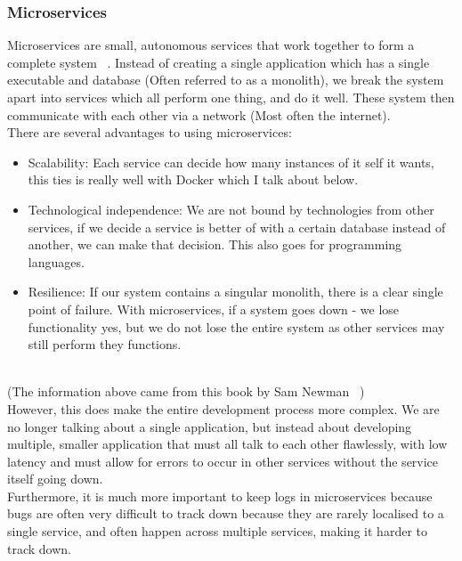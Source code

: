 \documentclass[titlepage]{article}
\begin{document}
\subsubsection{Microservices}
Microservices are small, autonomous services that work together to form a complete system ~\cite{newman_2016}. Instead of creating a single application which has a single executable and database (Often referred to as a monolith), we break the system apart into services which all perform one thing, and do it well. These system then communicate with each other via a network (Most often the internet). \\

There are several advantages to using microservices:
\begin{itemize}
  \item Scalability: Each service can decide how many instances of it self it wants, this ties is really well with Docker which I talk about below.
  \item Technological independence: We are not bound by technologies from other services, if we decide a service is better of with a certain database instead of another, we can make that decision. This also goes for programming languages.
  \item Resilience: If our system contains a singular monolith, there is a clear single point of failure. With microservices, if a system goes down - we lose functionality yes, but we do not lose the entire system as other services may still perform they functions.
\end{itemize} \\

(The information above came from this book by Sam Newman ~\cite{newman_2016}) \\

However, this does make the entire development process more complex. We are no longer talking about a single application, but instead about developing multiple, smaller application that must all talk to each other flawlessly, with low latency and must allow for errors to occur in other services without the service itself going down. \\

Furthermore, it is much more important to keep logs in microservices because bugs are often very difficult to track down because they are rarely localised to a single service, and often happen across multiple services, making it harder to track down. \\
\end{document}
